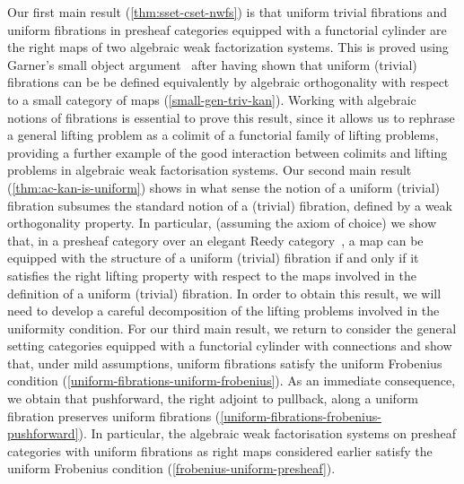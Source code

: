 \documentclass[reqno,10pt,a4paper,oneside,draft]{amsart}
\begin{document}
Our first main result (\cref{thm:sset-cset-nwfs}) is that uniform trivial fibrations and uniform fibrations in presheaf categories equipped with a functorial cylinder
are the right maps of two algebraic weak factorization systems.
This is proved using Garner's small object argument~\cite{garner:small-object-argument} after having shown that uniform (trivial) fibrations can be be defined equivalently by algebraic orthogonality with respect to a small category of maps (\cref{small-gen-triv-kan}).
Working with algebraic notions of fibrations is essential to prove this result, since it allows us to rephrase a general lifting problem as a colimit of a functorial family of lifting problems, providing
a further example of the good interaction between colimits and lifting problems
in algebraic weak factorisation systems.
Our second main result (\cref{thm:ac-kan-is-uniform}) shows in what sense the notion of a uniform (trivial) fibration subsumes the standard notion of a (trivial) fibration, defined by 
a weak orthogonality property. In particular, (assuming the axiom of choice) we show that, in a presheaf category over an elegant Reedy category~\cite{bergner-rezk-elegant}, a map can be equipped with the structure of a uniform (trivial) fibration if and only if it satisfies the right lifting property with respect to the maps involved in the definition of a uniform (trivial) fibration.
In order to obtain this result, we will need to develop a careful decomposition of the lifting problems involved in the uniformity condition.
For our third main result, we return to consider the general setting categories equipped with a functorial cylinder with connections and show that, under mild assumptions, uniform fibrations satisfy the uniform Frobenius condition (\cref{uniform-fibrations-uniform-frobenius}). As an immediate consequence, we obtain that pushforward, \ie the right adjoint to pullback, along a uniform fibration preserves uniform fibrations (\cref{uniform-fibrations-frobenius-pushforward}).
In particular, the algebraic weak factorisation systems on presheaf categories with uniform fibrations as right maps considered earlier satisfy the uniform Frobenius condition (\cref{frobenius-uniform-presheaf}).
\end{document}

